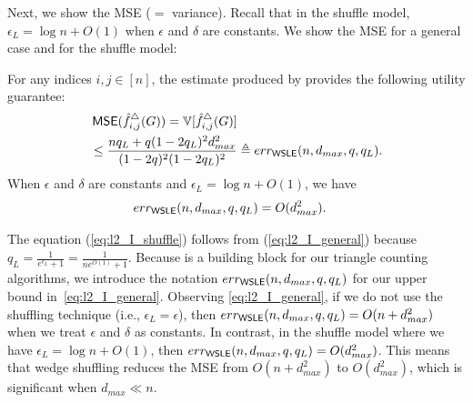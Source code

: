 Next,
we show the MSE ($=$ variance). 
Recall that in the shuffle model, $\epsilon_L = \log n + O(1)$ when $\epsilon$ and $\delta$ are constants.
We show
the MSE for a general case and for the shuffle model:
\begin{theorem}
\label{thm:l2-loss_I}
  For any indices $i,j \in [n]$, the estimate produced by
  \AlgWSLE{} provides the following utility guarantee:
\begin{align}
& \operatorname{\textsf{MSE}}(\hat{f}_{i,j}^\triangle(G)) = \mathbb{V}[\hat{f}_{i,j}^\triangle(G)] \nonumber\\
  & \leq \frac{n q_L + q(1-2q_L)^2 d_{max}^2}{(1-2q)^2(1-2q_L)^2} \triangleq
  err_{\textsf{WSLE}}(n,d_{max},q,q_L).
\label{eq:l2_I_general}
\end{align}
  When $\epsilon$ and $\delta$ are constants and $\epsilon_L = \log n + O(1)$, we
  have
\begin{align}
  & err_{\textsf{WSLE}{}}(n,d_{max}, q, q_L) = O(d_{max}^2).
\label{eq:l2_I_shuffle}
\end{align}
\end{theorem}
The equation (\ref{eq:l2_I_shuffle}) follows from (\ref{eq:l2_I_general}) because $q_L = \frac{1}{e^{\epsilon_L}+1} = \frac{1}{n e^{O(1)} + 1}$. 
Because \AlgWSLE{} is a building block for our triangle counting algorithms, we
introduce the notation $err_{\textsf{WSLE}{}}(n,d_{max}, q, q_L)$ for our upper bound
in~\eqref{eq:l2_I_general}. Observing
\eqref{eq:l2_I_general}, if we do not use the shuffling technique (i.e.,
$\epsilon_L = \epsilon$), then $err_{\textsf{WSLE}{}}(n,d_{max}, q, q_L) = O(n + d_{max}^2)$ when we
treat $\epsilon$ and $\delta$ as constants.
In contrast, in the shuffle model where we have $\epsilon_L = \log n + O(1)$,
then $err_{\textsf{WSLE}{}}(n,d_{max}, q, q_L) = O(d_{max}^2)$.
This means that wedge shuffling reduces the MSE from $O(n + d_{max}^2)$ to $O(d_{max}^2)$, which is significant when $d_{max} \ll n$.

